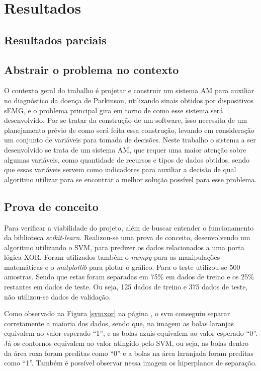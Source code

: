 \chapter{Resultados}
\label{ch:Resultados}
\section{Resultados parciais}
\section{Abstrair o problema no contexto}
O contexto geral do trabalho é projetar e construir um sistema AM para auxiliar no diagnóstico da doença de Parkinson, utilizando sinais obtidos por dispositivos sEMG, e o problema principal gira em torno de como esse sistema será desenvolvido. Por se tratar da construção de um software, isso necessita de um planejamento prévio de como será feita essa construção, levando em consideração um conjunto de variáveis para tomada de decisões. Neste trabalho o sistema a ser desenvolvido se trata de um sistema AM, que requer uma maior atenção sobre algumas variáveis, como quantidade de recursos e tipos de dados obtidos, sendo que essas variáveis servem como indicadores para auxiliar a decisão de qual algoritmo utilizar para se encontrar a melhor solução possível para esse problema.

\section{Prova de conceito}
Para verificar a viabilidade do projeto, além de buscar entender o funcionamento da biblioteca \textit{scikit-learn}. Realizou-se uma prova de conceito, desenvolvendo um algoritmo utilizando o SVM, para predizer os dados relacionados a uma porta lógica XOR. Foram utilizados também o \textit{numpy} para as manipulações matemáticas e o \textit{matplotlib} para plotar o gráfico. Para o teste utilizou-se 500 amostras. Sendo que estas foram separadas em 75\% em dados de treino e os 25\% restantes em dados de teste. Ou seja, 125 dados de treino e 375 dados de teste, não utilizou-se dados de validação.

Como observado na Figura \ref{svmxor} na página \pageref{svmxor}, o svm conseguiu separar corretamente a maioria dos dados, sendo que, na imagem as bolas laranjas equivalem ao valor esperado “1”, e as bolas azuis equivalem ao valor esperado “0”. Já os contornos equivalem ao valor atingido pelo SVM, ou seja, as bolas dentro da área roxa foram preditas como “0” e  a bolas na área laranjada foram preditas como “1”. Também é possível observar nessa imagem os hiperplanos de separação.

